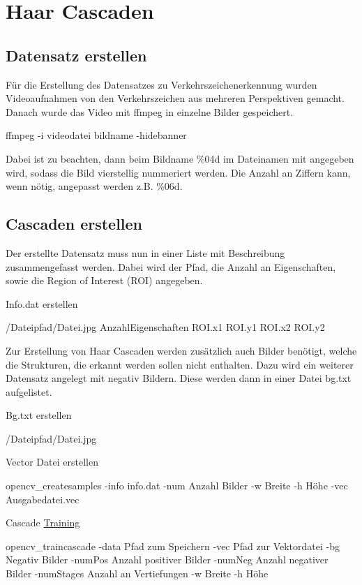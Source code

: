 \hypertarget{haar_cascades_dataset}{}\section{Haar Cascaden}\label{haar_cascades_dataset}
\hypertarget{haar_cascades_create_dataset}{}\subsection{Datensatz erstellen}\label{haar_cascades_create_dataset}
Für die Erstellung des Datensatzes zu Verkehrszeichenerkennung wurden Videoaufnahmen von den Verkehrszeichen aus mehreren Perspektiven gemacht. Danach wurde das Video mit ffmpeg in einzelne Bilder gespeichert.


\begin{DoxyCode}
ffmpeg -i videodatei bildname -hidebanner
\end{DoxyCode}


Dabei ist zu beachten, dann beim Bildname \%04d im Dateinamen mit angegeben wird, sodass die Bild vierstellig nummeriert werden. Die Anzahl an Ziffern kann, wenn nötig, angepasst werden z.\+B. \%06d.\hypertarget{haar_cascades_create_cascades}{}\subsection{Cascaden erstellen}\label{haar_cascades_create_cascades}
Der erstellte Datensatz muss nun in einer Liste mit Beschreibung zusammengefasst werden. Dabei wird der Pfad, die Anzahl an Eigenschaften, sowie die Region of Interest (R\+OI) angegeben.

Info.\+dat erstellen 
\begin{DoxyCode}
/Dateipfad/Datei.jpg AnzahlEigenschaften ROI.x1 ROI.y1 ROI.x2 ROI.y2
\end{DoxyCode}


Zur Erstellung von Haar Cascaden werden zusätzlich auch Bilder benötigt, welche die Strukturen, die erkannt werden sollen nicht enthalten. Dazu wird ein weiterer Datensatz angelegt mit negativ Bildern. Diese werden dann in einer Datei bg.\+txt aufgelistet.

Bg.\+txt erstellen 
\begin{DoxyCode}
/Dateipfad/Datei.jpg
\end{DoxyCode}


Vector Datei erstellen 
\begin{DoxyCode}
opencv\_createsamples -info info.dat -num Anzahl Bilder -w Breite -h Höhe -vec Ausgabedatei.vec
\end{DoxyCode}


Cascade \mbox{\hyperlink{namespace_training}{Training}} 
\begin{DoxyCode}
opencv\_traincascade -data Pfad zum Speichern -vec Pfad zur Vektordatei -bg Negativ Bilder -numPos Anzahl
       positiver Bilder -numNeg Anzahl negativer Bilder -numStages Anzahl an Vertiefungen -w Breite -h Höhe
\end{DoxyCode}
 